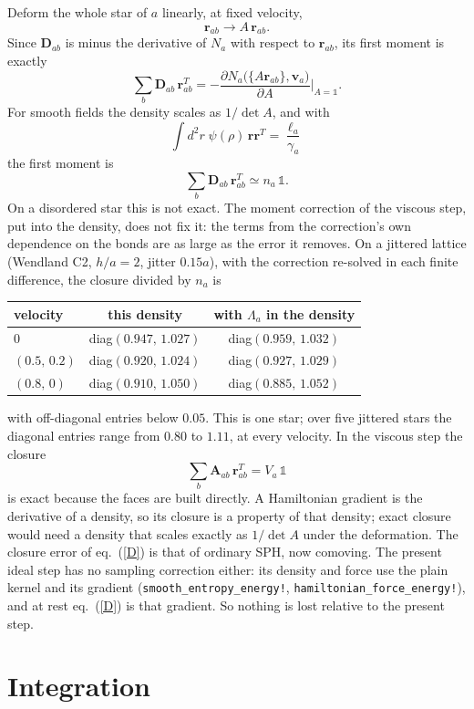 \documentclass[11pt,aps,preprint,nofootinbib,superscriptaddress,tightenlines]{revtex4-2}
\def\st{\begin{equation}}
\def\stp{\end{equation}}
\def\Eq#1{eq.~(\ref{#1})}
\newcommand{\one}{\mathds{1}}
\begin{document}
Deform the whole star of $a$ linearly, at fixed velocity,
\st
\bm r_{ab}\to A\,\bm r_{ab} .
\stp
Since $\bm D_{ab}$ is minus the derivative of $N_a$ with respect to $\bm r_{ab}$, its first moment is exactly
\st
\sum_b\bm D_{ab}\,\bm r_{ab}^T=-\frac{\partial N_a\big(\{A\bm r_{ab}\},\bm v_a\big)}{\partial A}\Big|_{A=\one} .
\label{closure}
\stp
For smooth fields the density scales as $1/\det A$, and with
\st
\int d^2r\;\psi(\rho)\,\bm r\bm r^T=\frac{\ell_a}{\gamma_a}
\stp
the first moment is
\st
\sum_b\bm D_{ab}\,\bm r_{ab}^T\simeq n_a\,\one .
\stp
On a disordered star this is not exact.  The moment correction of the viscous step, put into the density, does not fix it: the
terms from the correction's own dependence on the bonds are as large as the error it removes.  On a jittered lattice (Wendland C2,
$h/a=2$, jitter $0.15a$), with the correction re-solved in each finite difference, the closure divided by $n_a$ is
\begin{center}
\begin{tabular}{lcc}
velocity & this density & with $\Lambda_a$ in the density\\ \hline
$0$ & diag$(0.947,\,1.027)$ & diag$(0.959,\,1.032)$\\
$(0.5,\,0.2)$ & diag$(0.920,\,1.024)$ & diag$(0.927,\,1.029)$\\
$(0.8,\,0)$ & diag$(0.910,\,1.050)$ & diag$(0.885,\,1.052)$
\end{tabular}
\end{center}
with off-diagonal entries below $0.05$.  This is one star; over five jittered stars the diagonal entries range from $0.80$ to $1.11$, at
every velocity.  In the viscous step the closure
\st
\sum_b\bm A_{ab}\,\bm r_{ab}^T=V_a\,\one
\stp
is exact because the faces are built directly.  A Hamiltonian gradient is the derivative of a density, so its closure is a property of
that density; exact closure would need a density that scales exactly as $1/\det A$ under the deformation.  The closure error of
\Eq{D} is that of ordinary SPH, now comoving.  The present ideal step has no sampling correction either: its density and force use
the plain kernel and its gradient (\texttt{smooth\_entropy\_energy!}, \texttt{hamiltonian\_force\_energy!}), and at rest \Eq{D} is that gradient.
So nothing is lost relative to the present step.

\section{Integration}
\label{sec:integration}
\end{document}
